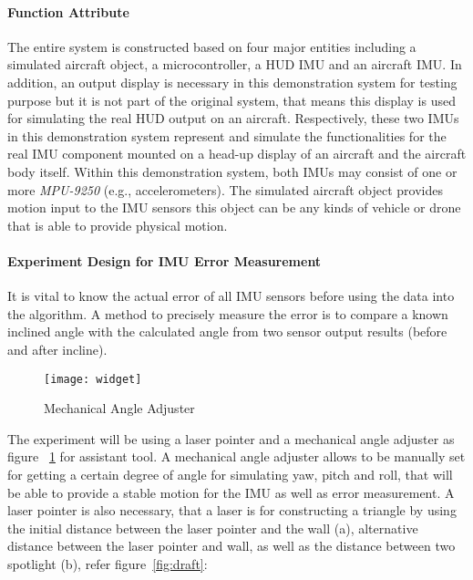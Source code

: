 			\paragraph{Function Attribute}
			The entire system is constructed based on four major entities including a simulated aircraft object, a microcontroller, a HUD IMU and an aircraft IMU. In addition, an output display is necessary in this demonstration system for testing purpose but it is not part of the original system, that means this display is used for simulating the real HUD output on an aircraft. Respectively, these two IMUs in this demonstration system represent and simulate the functionalities for the real IMU component mounted on a head-up display of an aircraft and the aircraft body itself. Within this demonstration system, both IMUs may consist of one or more \textit{MPU-9250} (e.g., accelerometers). The simulated aircraft object provides motion input to the IMU sensors this object can be any kinds of vehicle or drone that is able to provide physical motion.\\


			\paragraph{Experiment Design for IMU Error Measurement}
			It is vital to know the actual error of all IMU sensors before using the data into the algorithm. A method to precisely measure the error is to compare a known inclined angle with the calculated angle from two sensor output results (before and after incline).

			\begin{figure}
				\centering
			 		\caption{Mechanical Angle Adjuster}
			      	\texttt{[image: widget]}
			    \label{fig:widget}
			\end{figure}

			The experiment will be using a laser pointer and a mechanical angle adjuster as figure ~\ref{fig:widget} for assistant tool. A mechanical angle adjuster allows to be manually set for getting a certain degree of angle for simulating yaw, pitch and roll, that will be able to provide a stable motion for the IMU as well as error measurement. A laser pointer is also necessary, that a laser is for constructing a triangle by using the initial distance between the laser pointer and the wall (a), alternative distance between the laser pointer and wall, as well as the distance between two spotlight (b), refer figure~\ref{fig:draft}:

